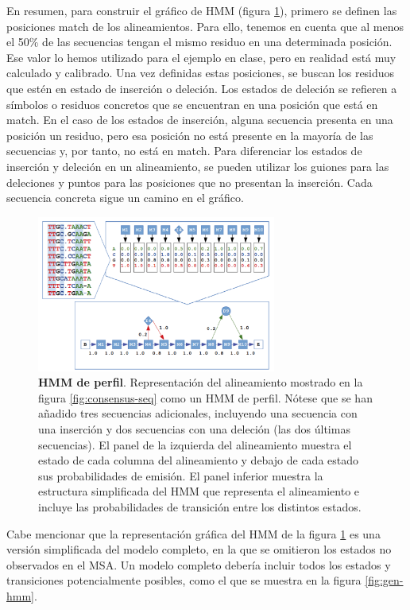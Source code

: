 En resumen, para construir el gráfico de HMM (figura \ref{fig:prof-hmm}), primero se definen las posiciones match de los alineamientos. Para ello, tenemos en cuenta que al menos el 50\% de las secuencias tengan el mismo residuo en una determinada posición. Ese valor lo hemos utilizado para el ejemplo en clase, pero en realidad está muy calculado y calibrado. Una vez definidas estas posiciones, se buscan los residuos que estén en estado de inserción o deleción. Los estados de deleción se refieren a símbolos o residuos concretos que se encuentran en una posición que está en match. En el caso de los estados de inserción, alguna secuencia presenta en una posición un residuo, pero esa posición no está presente en la mayoría de las secuencias y, por tanto, no está en match. Para diferenciar los estados de inserción y deleción en un alineamiento, se pueden utilizar los guiones para las deleciones y puntos para las posiciones que no presentan la inserción. Cada secuencia concreta sigue un camino en el gráfico. 

\begin{figure}[htbp]
\centering
\includegraphics[width = 0.7\textwidth]{figs/profile-hmm.png}
\caption{\textbf{HMM de perfil}. Representación del alineamiento mostrado en la figura \ref{fig:consensus-seq} como un HMM de perfil. Nótese que se han añadido tres secuencias adicionales, incluyendo una secuencia con una inserción y dos secuencias con una deleción (las dos últimas secuencias). El panel de la izquierda del alineamiento muestra el estado de cada columna del alineamiento y debajo de cada estado sus probabilidades de emisión. El panel inferior muestra la estructura simplificada del HMM que representa el alineamiento e incluye las probabilidades de transición entre los distintos estados.}
\label{fig:prof-hmm}
\end{figure}

Cabe mencionar que la representación gráfica del HMM de la figura \ref{fig:prof-hmm} es una versión simplificada del modelo completo, en la que se omitieron los estados no observados en el MSA. Un modelo completo debería incluir todos los estados y transiciones potencialmente posibles, como el que se muestra en la figura \ref{fig:gen-hmm}.

